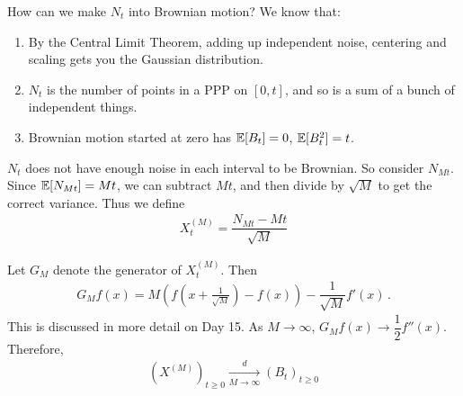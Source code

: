 \documentclass[../../../Master/AppliedStochastics.tex]{subfiles}
\begin{document}
\begin{example}{How can we make $N_t$ into Brownian motion?}
    We know that:
    \begin{enumerate}
        \item
        By the Central Limit Theorem, adding up independent noise,
            centering and scaling gets you the Gaussian distribution.
        
        \item
        $N_t$ is the number of points in a PPP on $[0, t]$,
            and so is a sum of a bunch of independent things.
        
        \item
        Brownian motion started at zero has $\mathbb{E}[B_t] = 0$, $\mathbb{E}[B_t^2] = t$.
    \end{enumerate}
    $N_t$ does not have enough noise in each interval to be Brownian.
    So consider $N_{M t}$.
    Since $\mathbb{E}[N_{M t}] = M t$, we can subtract $Mt$,
        and then divide by $\sqrt{M}$ to get the correct variance.
    Thus we define
    $$\begin{aligned}
        X_t^{(M)} = \dfrac{ N_{M t} - M t}{\sqrt{M}}
    \end{aligned}$$
    
    Let $G_M$ denote the generator of $X_t^{(M)}$.
    Then
    $$\begin{aligned}
        G_M f(x) = M \left(f \left(x + \frac{1}{\sqrt{M}}\right)
                            - f(x)\right) - \dfrac{1}{\sqrt{M}} f'(x)\,.
    \end{aligned}$$
    This is discussed in more detail on Day 15. 
    As $M \to \infty$, $G_M f(x) \to \dfrac{1}{2} f''(x)$. 
    Therefore, 
    $$\begin{aligned}
        (X^{(M)})_{t \geq 0} \xrightarrow[M \to \infty]{d} (B_t)_{t \geq 0}
    \end{aligned}$$
\end{example}


%
\end{document}
